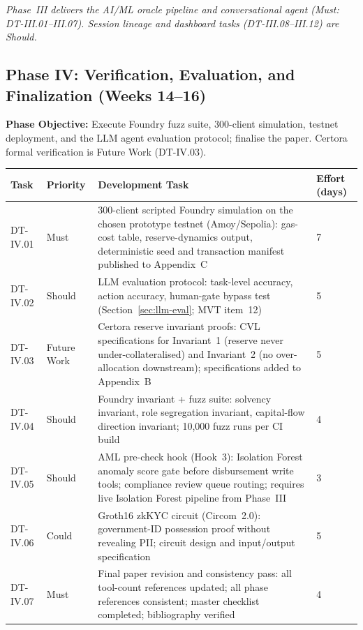\documentclass[12pt,a4paper]{report}
\newcommand{\tableheadcolor}{\rowcolor{TableHeadBg}}
\begin{document}
\vspace{2pt}
\noindent\textit{\small Phase~III delivers the AI/ML oracle pipeline and conversational agent (Must: DT-III.01--III.07). Session lineage and dashboard tasks (DT-III.08--III.12) are Should.}

\subsection{Phase IV: Verification, Evaluation, and Finalization (Weeks 14--16)}

\textbf{Phase Objective:} Execute Foundry fuzz suite, 300-client simulation, testnet deployment, and the LLM agent evaluation protocol; finalise the paper. Certora formal verification is Future Work (DT-IV.03).

\begin{table}[H]
\centering
\begin{tabular}{p{1.8cm}p{1.8cm}p{7.5cm}p{1.5cm}}
\toprule
\tableheadcolor
\textbf{Task} & \textbf{Priority} & \textbf{Development Task} & \textbf{Effort (days)} \\
\midrule
DT-IV.01 & Must & 300-client scripted Foundry simulation on the chosen prototype testnet (Amoy/Sepolia): gas-cost table, reserve-dynamics output, deterministic seed and transaction manifest published to Appendix~C & 7 \\
DT-IV.02 & Should & LLM evaluation protocol: task-level accuracy, action accuracy, human-gate bypass test (Section~\ref{sec:llm-eval}; MVT item~12) & 5 \\
DT-IV.03 & Future Work & Certora reserve invariant proofs: CVL specifications for Invariant~1 (reserve never under-collateralised) and Invariant~2 (no over-allocation downstream); specifications added to Appendix~B & 5 \\
DT-IV.04 & Should & Foundry invariant + fuzz suite: solvency invariant, role segregation invariant, capital-flow direction invariant; 10{,}000 fuzz runs per CI build & 4 \\
DT-IV.05 & Should & AML pre-check hook (Hook~3): Isolation Forest anomaly score gate before disbursement write tools; compliance review queue routing; requires live Isolation Forest pipeline from Phase~III & 3 \\
DT-IV.06 & Could & Groth16 zkKYC circuit (Circom~2.0): government-ID possession proof without revealing PII; circuit design and input/output specification & 5 \\
DT-IV.07 & Must & Final paper revision and consistency pass: all tool-count references updated; all phase references consistent; master checklist completed; bibliography verified & 4 \\

\end{tabular}
\end{table}
\end{document}
